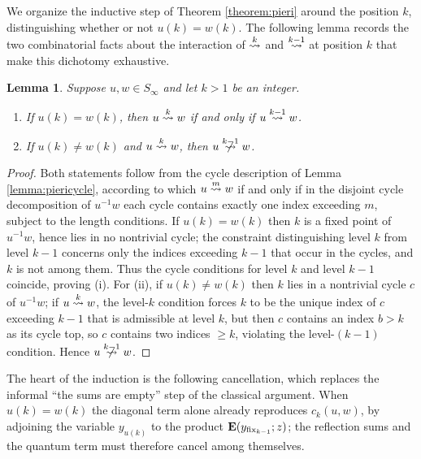 \documentclass{amsart}
\newtheorem{lemma}{Lemma}[section]
\theoremstyle{definition}
\theoremstyle{remark}
\numberwithin{equation}{section}
\newcommand{\xrightsquigarrow}[2][]{%
	\mathrel{\mathop{\rightsquigarrow}\limits^{\scriptstyle #2}%
	\ifx\hfuzz#1\hfuzz\else_{\scriptstyle #1}\fi}%
}
\newcommand{\tom}[1]{\ensuremath{\xrightsquigarrow{#1}}}
\newcommand{\fx}{\mathrm{fix}}
\begin{document}
We organize the inductive step of Theorem \ref{theorem:pieri} around the position $k$, distinguishing whether or not $u(k)=w(k)$. The following lemma records the two combinatorial facts about the interaction of $\tom{k}$ and $\tom{k-1}$ at position $k$ that make this dichotomy exhaustive.

\begin{lemma} \label{lemma:leveldichotomy}
Suppose $u,w\in S_\infty$ and let $k>1$ be an integer.
\begin{enumerate}
\item[(i)] If $u(k)=w(k)$, then $u\tom{k}w$ if and only if $u\tom{k-1}w$.
\item[(ii)] If $u(k)\neq w(k)$ and $u\tom{k}w$, then $u\ntom{k-1}w$.
\end{enumerate}
\end{lemma}
\begin{proof}
Both statements follow from the cycle description of Lemma \ref{lemma:piericycle}, according to which $u\tom{m}w$ if and only if in the disjoint cycle decomposition of $u^{-1}w$ each cycle contains exactly one index exceeding $m$, subject to the length conditions. If $u(k)=w(k)$ then $k$ is a fixed point of $u^{-1}w$, hence lies in no nontrivial cycle; the constraint distinguishing level $k$ from level $k-1$ concerns only the indices exceeding $k-1$ that occur in the cycles, and $k$ is not among them. Thus the cycle conditions for level $k$ and level $k-1$ coincide, proving (i). For (ii), if $u(k)\neq w(k)$ then $k$ lies in a nontrivial cycle $c$ of $u^{-1}w$; if $u\tom{k}w$, the level-$k$ condition forces $k$ to be the unique index of $c$ exceeding $k-1$ that is admissible at level $k$, but then $c$ contains an index $b>k$ as its cycle top, so $c$ contains two indices $\geq k$, violating the level-$(k-1)$ condition. Hence $u\ntom{k-1}w$.
\end{proof}

The heart of the induction is the following cancellation, which replaces the informal ``the sums are empty'' step of the classical argument. When $u(k)=w(k)$ the diagonal term alone already reproduces $c_k(u,w)$, by adjoining the variable $y_{u(k)}$ to the product $\wte(y_{\fx_{{k-1}}};z)$; the reflection sums and the quantum term must therefore cancel among themselves.
\end{document}
